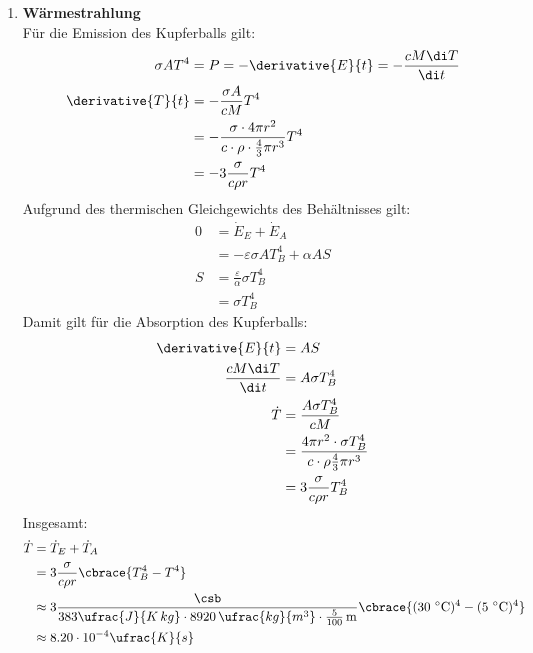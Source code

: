 \documentclass[11pt,letterpaper]{article}
\begin{document}

\begin{enumerate}
    \item \textbf{Wärmestrahlung}\\
    Für die Emission des Kupferballs gilt:
    \begin{align*}
         \sigma A T^4 &= P = -\derivative{E}{t} = -\frac{c M\di T}{\di t}\\
        \derivative{T}{t} &= -\frac{ \sigma A}{c M}  T^4\\
        &= -\frac{ \sigma \cdot 4\pi r^2}{c\cdot \rho \cdot \frac{4}{3}\pi r^3}  T^4\\
        &= -3\frac{ \sigma}{c \rho r}  T^4
    \end{align*}
    Aufgrund des thermischen Gleichgewichts des Behältnisses gilt:
    \begin{align*}
        0 &= \dot{E}_E + \dot{E}_A\\
        &= -\varepsilon \sigma A T_B^4 + \alpha A S\\
        S &= \frac{\varepsilon}{\alpha}\sigma T_B^4\\
        &= \sigma T_B^4
    \end{align*}
    Damit gilt für die Absorption des Kupferballs:
    \begin{align*}
        \derivative{E}{t} &= AS\\
        \frac{c M\di T}{\di t} &= A \sigma T_B^4\\
        \dot{T} &= \frac{A \sigma T_B^4}{c M}\\
        &= \frac{4\pi r^2 \cdot \sigma T_B^4}{c \cdot \rho\frac{4}{3}\pi r^3}\\
        &= 3 \frac{ \sigma }{c \rho r} T_B^4
    \end{align*}
    Insgesamt:
    \begin{align*}
        \dot{T} &= \dot{T}_E + \dot{T}_A\\
        &= 3\frac{\sigma}{c \rho r} \cbrace{T_B^4
        -T^4}
        \\
        &\approx 3\frac{\csb}{383\ufrac{J}{K\,kg} \cdot  8920\, \ufrac{kg}{m^3} \cdot \frac{5}{100}\,\mathrm{m}} \cbrace{(30\ ^\circ\mathrm{C})^4
        - (5\ ^\circ\mathrm{C})^4}\\
        &\approx 8.20\cdot 10 ^{-4} \ufrac{K}{s}
    \end{align*}


\end{enumerate}
\end{document}
